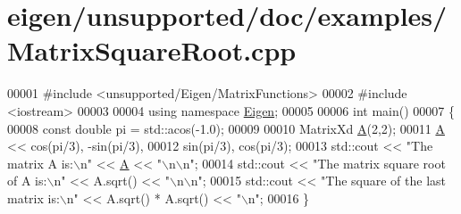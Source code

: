 \hypertarget{eigen_2unsupported_2doc_2examples_2_matrix_square_root_8cpp_source}{}\section{eigen/unsupported/doc/examples/\+Matrix\+Square\+Root.cpp}
\label{eigen_2unsupported_2doc_2examples_2_matrix_square_root_8cpp_source}

\begin{DoxyCode}
00001 \textcolor{preprocessor}{#include <unsupported/Eigen/MatrixFunctions>}
00002 \textcolor{preprocessor}{#include <iostream>}
00003 
00004 \textcolor{keyword}{using namespace }\hyperlink{namespace_eigen}{Eigen};
00005 
00006 \textcolor{keywordtype}{int} main()
00007 \{
00008   \textcolor{keyword}{const} \textcolor{keywordtype}{double} pi = std::acos(-1.0);
00009 
00010   MatrixXd \hyperlink{group___core___module_class_eigen_1_1_matrix}{A}(2,2);
00011   \hyperlink{group___core___module_class_eigen_1_1_matrix}{A} << cos(pi/3), -sin(pi/3), 
00012        sin(pi/3),  cos(pi/3);
00013   std::cout << \textcolor{stringliteral}{"The matrix A is:\(\backslash\)n"} << \hyperlink{group___core___module_class_eigen_1_1_matrix}{A} << \textcolor{stringliteral}{"\(\backslash\)n\(\backslash\)n"};
00014   std::cout << \textcolor{stringliteral}{"The matrix square root of A is:\(\backslash\)n"} << A.sqrt() << \textcolor{stringliteral}{"\(\backslash\)n\(\backslash\)n"};
00015   std::cout << \textcolor{stringliteral}{"The square of the last matrix is:\(\backslash\)n"} << A.sqrt() * A.sqrt() << \textcolor{stringliteral}{"\(\backslash\)n"};
00016 \}
\end{DoxyCode}
